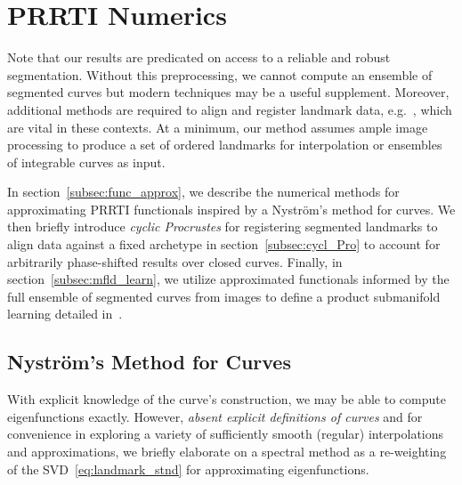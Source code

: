 \documentclass[pdflatex,iicol]{sn-jnl}%
\theoremstyle{thmstyleone}%
\theoremstyle{thmstyletwo}%
\theoremstyle{thmstylethree}%
\begin{document}

\section{PRRTI Numerics}\label{sec:numerics}
Note that our results are predicated on access to a reliable and robust segmentation. Without this preprocessing, we cannot compute an ensemble of segmented curves but modern techniques may be a useful supplement. Moreover, additional methods are required to align and register landmark data, e.g.~\cite{dogan2015fast, al2013continuous, rangarajan1997softassign, srivastava2016functional}, which are vital in these contexts. At a minimum, our method assumes ample image processing to produce a set of ordered landmarks for interpolation or ensembles of integrable curves as input. 

In section~\ref{subsec:func_approx}, we describe the numerical methods for approximating PRRTI functionals inspired by a Nystr\"om's method for curves. We then briefly introduce \textit{cyclic Procrustes} for registering segmented landmarks to align data against a fixed archetype in section~\ref{subsec:cycl_Pro} to account for arbitrarily phase-shifted results over closed curves. Finally, in section~\ref{subsec:mfld_learn}, we utilize approximated functionals informed by the full ensemble of segmented curves from images to define a product submanifold learning detailed in~\cite{grey2023separable}.

%

\subsection{Nystr{\"o}m's Method for Curves}\label{subsec:Nystrom}
With explicit knowledge of the curve's construction, we may be able to compute eigenfunctions exactly. However, \emph{absent explicit definitions of curves} and for convenience in exploring a variety of sufficiently smooth (regular) interpolations and approximations, we briefly elaborate on a spectral method as a re-weighting of the SVD~\eqref{eq:landmark_stnd} for approximating eigenfunctions.
\end{document}
